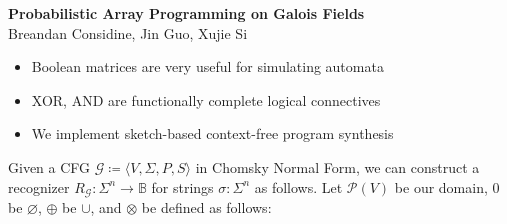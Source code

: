 \documentclass[portrait,a0b,final,a4resizeable]{a0poster}
\def\jointspacing{\vspace{0.3in}}
\begin{document}
  \begin{poster}
    \vspace{1\baselineskip}   %


    \begin{center}
      \begin{pcolumn}{1.03}
        \begin{minipage}[c][9cm][c]{0.85\textwidth}
          \begin{center}
          {\veryHuge \textbf{Probabilistic Array Programming on Galois Fields}}\\[10mm]
          {\huge Breandan Considine, Jin Guo, Xujie Si\\[7.5mm]
          }
          \end{center}
        \end{minipage}
      \end{pcolumn}
    \end{center}

    \vspace*{1.5cm}

    \large



    \Large

    \begin{multicols}{2}



      \vspace*{-1cm}
      \null\hspace*{3cm}\begin{minipage}[c]{0.85\columnwidth}
      \begin{itemize}
        \item Boolean matrices are very useful for simulating automata
        \item XOR, AND are functionally complete logical connectives
        \item We implement sketch-based context-free program synthesis
      \end{itemize}
      \end{minipage}

      \jointspacing

      \null\hspace*{3cm}\begin{minipage}[c]{0.85\columnwidth}
          Given a CFG $\mathcal{G} \coloneqq \langle V, \Sigma, P, S\rangle$ in Chomsky Normal Form, we can construct a recognizer $R_\mathcal{G}: \Sigma^n \rightarrow \mathbb{B}$ for strings $\sigma: \Sigma^n$ as follows. Let $\mathcal P(V)$ be our domain, $0$ be $\varnothing$, $\oplus$ be $\cup$, and $\otimes$ be defined as follows:\\
      \end{minipage}


\end{multicols}
\end{poster}
\end{document}
